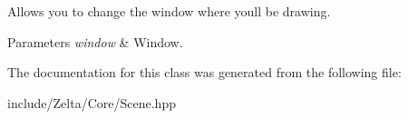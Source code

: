Allows you to change the window where you\textquotesingle{}ll be drawing. 


\begin{DoxyParams}{Parameters}
{\em window} & Window. \\
\hline
\end{DoxyParams}


The documentation for this class was generated from the following file\+:\begin{DoxyCompactItemize}
\item 
include/\+Zelta/\+Core/Scene.\+hpp\end{DoxyCompactItemize}
